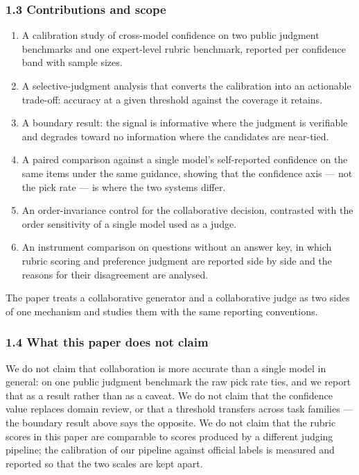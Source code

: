 \documentclass[
]{article}
\providecommand{\tightlist}{%
  \setlength{\itemsep}{0pt}\setlength{\parskip}{0pt}}
\begin{document}
\subsubsection{1.3 Contributions and scope}\label{contributions}

\begin{enumerate}
\def\labelenumi{\arabic{enumi}.}
\tightlist
\item
  A calibration study of cross-model confidence on two public judgment benchmarks and
  one expert-level rubric benchmark, reported per confidence band with sample sizes.
\item
  A selective-judgment analysis that converts the calibration into an actionable
  trade-off: accuracy at a given threshold against the coverage it retains.
\item
  A boundary result: the signal is informative where the judgment is verifiable and
  degrades toward no information where the candidates are near-tied.
\item
  A paired comparison against a single model's self-reported confidence on the same
  items under the same guidance, showing that the confidence axis --- not the pick rate
  --- is where the two systems differ.
\item
  An order-invariance control for the collaborative decision, contrasted with the
  order sensitivity of a single model used as a judge.
\item
  An instrument comparison on questions without an answer key, in which rubric
  scoring and preference judgment are reported side by side and the reasons for their
  disagreement are analysed.
\end{enumerate}

The paper treats a collaborative generator and a collaborative judge as two sides of
one mechanism and studies them with the same reporting conventions.

\subsubsection{1.4 What this paper does not claim}\label{not-claim}

We do not claim that collaboration is more accurate than a single model in general: on
one public judgment benchmark the raw pick rate ties, and we report that as a result
rather than as a caveat. We do not claim that the confidence value replaces domain
review, or that a threshold transfers across task families --- the boundary result
above says the opposite. We do not claim that the rubric scores in this paper are
comparable to scores produced by a different judging pipeline; the calibration of our
pipeline against official labels is measured and reported so that the two scales are
kept apart.
\end{document}
